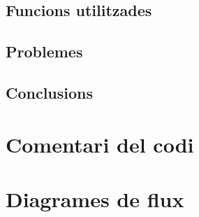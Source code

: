 \documentclass{../pdae} %
\begin{document}
\subsection{Funcions utilitzades}

\subsection{Problemes}

\subsection{Conclusions}

\section{Comentari del codi}

\section{Diagrames de flux}
\end{document}
